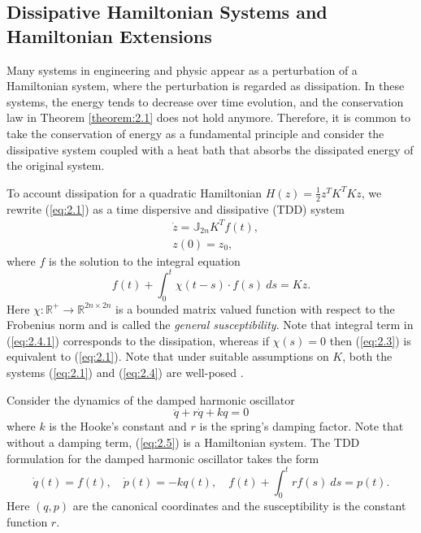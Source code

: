 \subsection{Dissipative Hamiltonian Systems and Hamiltonian Extensions}

Many systems in engineering and physic appear as a perturbation of a Hamiltonian system, where the perturbation is regarded as dissipation. In these systems, the energy tends to decrease over time evolution, and the conservation law in Theorem \ref{theorem:2.1} does not hold anymore. Therefore, it is common to take the conservation of energy as a fundamental principle and consider the dissipative system coupled with a heat bath that absorbs the dissipated energy of the original system. 

To account dissipation for a quadratic Hamiltonian $H(z) = \frac 1 2 z^T K^T K  z$, we rewrite (\ref{eq:2.1}) as a time dispersive and dissipative (TDD) \cite{Figotin:2006jy} system 
\begin{equation} \label{eq:2.4}
	\begin{aligned}
		& \dot {z} = \mathbb J_{2n} K^T f(t), \\
		& z(0) = z_0,
	\end{aligned}
\end{equation}
where $f$ is the solution to the integral equation
\begin{equation} \label{eq:2.4.1}
	f(t) + \int_0^t \chi(t-s) \cdot f(s)\ ds = K z.
\end{equation}
Here $\chi:\mathbb R^+\to \mathbb R^{2n\times 2n}$ is a bounded matrix valued function with respect to the Frobenius norm and is called the \emph{general susceptibility}. Note that integral term in (\ref{eq:2.4.1}) corresponds to the dissipation, whereas if $\chi(s) = 0$ then (\ref{eq:2.3}) is equivalent to (\ref{eq:2.1}). Note that under suitable assumptions on $K$, both the systems (\ref{eq:2.1}) and (\ref{eq:2.4}) are well-posed \cite{Figotin:2006jy}.

\begin{example} \label{example:2.1}
Consider the dynamics of the damped harmonic oscillator
\begin{equation} \label{eq:2.5}
	\ddot q + r \dot q + k q = 0
\end{equation}
where $k$ is the Hooke's constant and $r$ is the spring's damping factor. Note that without a damping term, (\ref{eq:2.5}) is a Hamiltonian system. The TDD formulation for the damped harmonic oscillator takes the form
\begin{equation} \label{eq:2.6}
	\dot q(t) = f(t), \quad \dot p(t) = - k q(t), \quad f(t) + \int_0^t r f(s) \ ds = p(t).
\end{equation}
Here $(q,p)$ are the canonical coordinates and the susceptibility is the constant function $r$.
\end{example}

